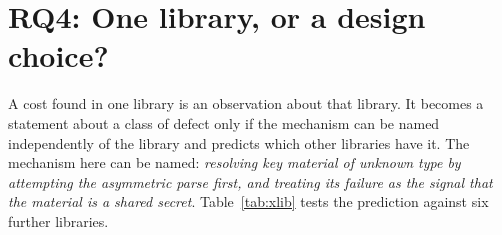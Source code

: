 \documentclass[preprint,12pt,authoryear]{elsarticle}
\begin{document}
\section{RQ4: One library, or a design choice?}\label{sec:rq4}

A cost found in one library is an observation about that library. It becomes a
statement about a class of defect only if the mechanism can be named
independently of the library and predicts which other libraries have it. The
mechanism here can be named: \emph{resolving key material of unknown type by
attempting the asymmetric parse first, and treating its failure as the signal
that the material is a shared secret}. Table~\ref{tab:xlib} tests the
prediction against six further libraries.
\end{document}
